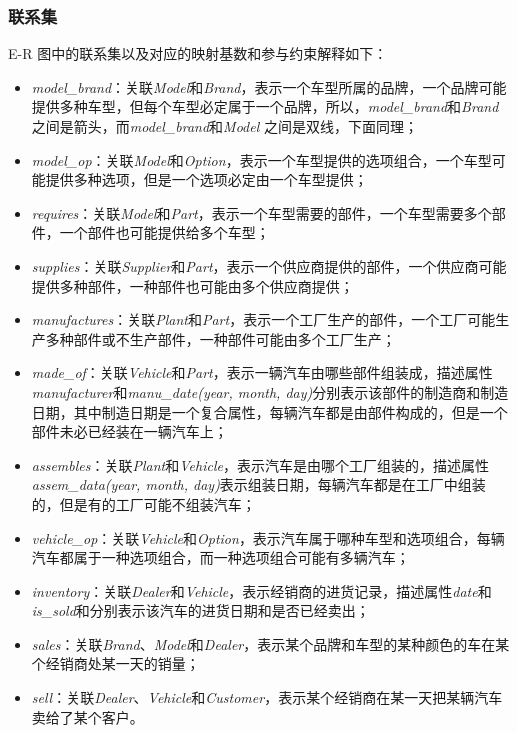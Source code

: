 \documentclass[hyperref,a4paper,UTF8]{ctexart}
\begin{document}
\subsubsection{联系集\label{sec:relationship-set}}

E-R 图中的联系集以及对应的映射基数和参与约束解释如下：

\begin{itemize}[itemsep=2pt,topsep=0pt,parsep=0pt]
    \item \textit{model\_brand}：关联\textit{Model}和\textit{Brand}，表示一个车型所属的品牌，一个品牌可能提供多种车型，但每个车型必定属于一个品牌，所以，\textit{model\_brand}和\textit{Brand} 之间是箭头，而\textit{model\_brand}和\textit{Model} 之间是双线，下面同理；
    \item \textit{model\_op}：关联\textit{Model}和\textit{Option}，表示一个车型提供的选项组合，一个车型可能提供多种选项，但是一个选项必定由一个车型提供；
    \item \textit{requires}：关联\textit{Model}和\textit{Part}，表示一个车型需要的部件，一个车型需要多个部件，一个部件也可能提供给多个车型；
    \item \textit{supplies}：关联\textit{Supplier}和\textit{Part}，表示一个供应商提供的部件，一个供应商可能提供多种部件，一种部件也可能由多个供应商提供；
    \item \textit{manufactures}：关联\textit{Plant}和\textit{Part}，表示一个工厂生产的部件，一个工厂可能生产多种部件或不生产部件，一种部件可能由多个工厂生产；
    \item \textit{made\_of}：关联\textit{Vehicle}和\textit{Part}，表示一辆汽车由哪些部件组装成，描述属性\textit{manufacturer}和\textit{manu\_date(year, month, day)}分别表示该部件的制造商和制造日期，其中制造日期是一个复合属性，每辆汽车都是由部件构成的，但是一个部件未必已经装在一辆汽车上；
    \item \textit{assembles}：关联\textit{Plant}和\textit{Vehicle}，表示汽车是由哪个工厂组装的，描述属性\textit{assem\_data(year, month, day)}表示组装日期，每辆汽车都是在工厂中组装的，但是有的工厂可能不组装汽车；
    \item \textit{vehicle\_op}：关联\textit{Vehicle}和\textit{Option}，表示汽车属于哪种车型和选项组合，每辆汽车都属于一种选项组合，而一种选项组合可能有多辆汽车；
    \item \textit{inventory}：关联\textit{Dealer}和\textit{Vehicle}，表示经销商的进货记录，描述属性\textit{date}和\textit{is\_sold}和分别表示该汽车的进货日期和是否已经卖出；
    \item \textit{sales}：关联\textit{Brand}、\textit{Model}和\textit{Dealer}，表示某个品牌和车型的某种颜色的车在某个经销商处某一天的销量；
    \item \textit{sell}：关联\textit{Dealer}、\textit{Vehicle}和\textit{Customer}，表示某个经销商在某一天把某辆汽车卖给了某个客户。
\end{itemize}
\end{document}
